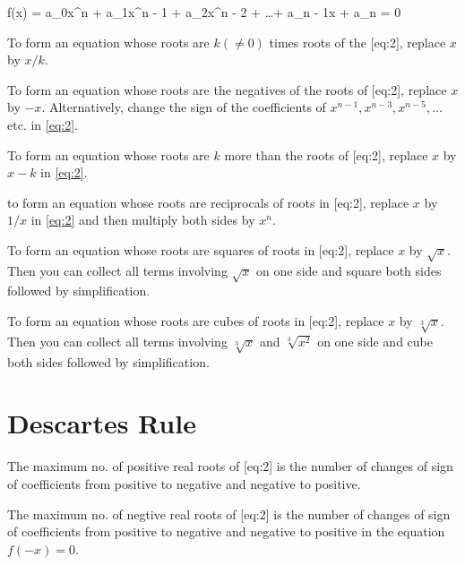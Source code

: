 \placeformula[eq:2]
\startformula
  f(x) = a_0x^n + a_1x^{n - 1} + a_2x^{n - 2} + \ldots + a_{n - 1}x + a_n = 0
\stopformula
\startitemize[n]
\item To form an equation whose roots are $k(\neq 0)$ times roots of the [eq:2], replace $x$ by $x/k$.
\item To form an equation whose roots are the negatives of the roots of [eq:2], replace $x$ by $-x$. Alternatively, change
  the sign of the coefficients of $x^{n - 1}, x^{n - 3}, x^{n - 5}, \ldots$ etc. in \ref{eq:2}.
\item To form an equation whose roots are $k$ more than the roots of [eq:2], replace $x$ by $x - k$ in \ref{eq:2}.
\item to form an equation whose roots are reciprocals of roots in [eq:2], replace $x$ by $1/x$ in \ref{eq:2} and then
  multiply both sides by $x^n$.
\item To form an equation whose roots are squares of roots in [eq:2], replace $x$ by $\sqrt{x}$. Then you can collect all
  terms involving $\sqrt{x}$ on one side and square both sides followed by simplification.
\item To form an equation whose roots are cubes of roots in [eq:2], replace $x$ by $\sqrt[3]{x}$. Then you can collect all
  terms involving $\sqrt[3]{x}$ and $\sqrt[3]{x^2}$ on one side and cube both sides followed by simplification.
\stopitemize

\section{Descartes Rule}
\startitemize[n]
\item[Rule 1:] The maximum no. of positive real roots of [eq:2] is the number of changes of sign of coefficients from
  positive to negative and negative to positive.
\item[Rule 2:] The maximum no. of negtive real roots of [eq:2] is the number of changes of sign of coefficients from
  positive to negative and negative to positive in the equation $f(-x) = 0$.
\stopitemize


